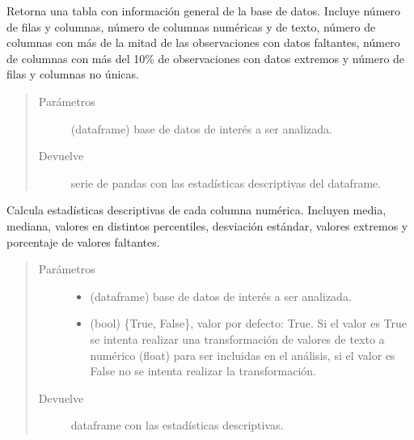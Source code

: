 \documentclass[letterpaper,10pt,openany,spanish]{sphinxmanual}
\begin{document}
\begin{fulllineitems}
\label{\detokenize{datos:datos.data_summary}}
Retorna una tabla con información general de la base de datos. Incluye número de filas y columnas, número de columnas numéricas y de texto, número de columnas con más de la mitad de las observaciones con datos faltantes, número de columnas con más del 10\% de observaciones con datos extremos y número de filas y columnas no únicas.
\begin{quote}\begin{description}
\item[{Parámetros}] \leavevmode
{} \textendash{} (dataframe) base de datos de interés a ser analizada.

\item[{Devuelve}] \leavevmode
serie de pandas con las estadísticas descriptivas del dataframe.

\end{description}\end{quote}

\end{fulllineitems}


\begin{fulllineitems}
\label{\detokenize{datos:datos.descriptive_stats}}
Calcula estadísticas descriptivas de cada columna numérica. Incluyen media, mediana, valores en distintos percentiles, desviación estándar, valores extremos y porcentaje de valores faltantes.
\begin{quote}\begin{description}
\item[{Parámetros}] \leavevmode\begin{itemize}
\item {} 
 \textendash{} (dataframe) base de datos de interés a ser analizada.

\item {} 
 \textendash{} (bool) \{True, False\}, valor por defecto: True. Si el valor es True se intenta realizar una transformación de valores de texto a numérico (float) para ser incluidas en el análisis, si el valor es False no se intenta realizar la transformación.

\end{itemize}

\item[{Devuelve}] \leavevmode
dataframe con las estadísticas descriptivas.

\end{description}\end{quote}

\end{fulllineitems}
\end{document}
